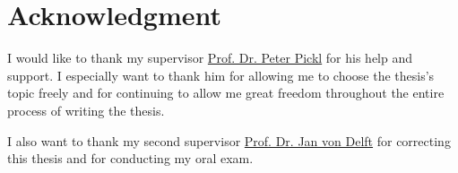 \cleardoublepage
{} \label{acknowledgment}

\chapter*{Acknowledgment}

I would like to thank my supervisor \href{http://www.mathematik.uni-muenchen.de/personen/professoren/pickl/index.html}{Prof. Dr. Peter Pickl} for his help and support. I especially want to thank him for allowing me to choose the thesis's topic freely and for continuing to allow me great freedom throughout the entire process of writing the thesis.

I also want to thank my second supervisor \href{http://homepages.physik.uni-muenchen.de/~vondelft/}{Prof. Dr. Jan von Delft} for correcting this thesis and for conducting my oral exam.